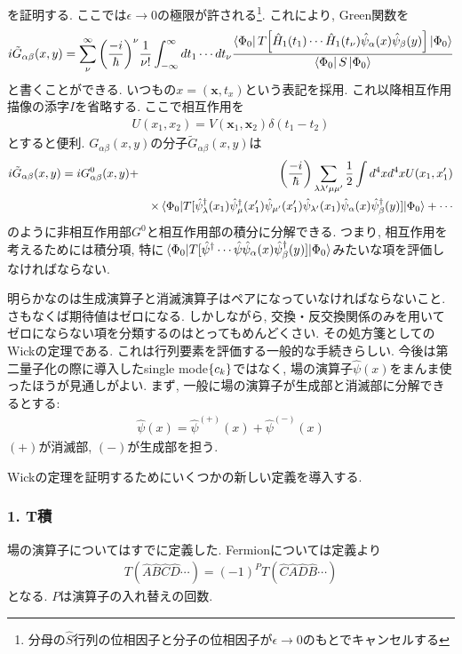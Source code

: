 \documentclass[10.5pt,a4paper]{jreport}
\newcommand{\bx}{\bm{x}}
\newcommand{\hpsi}{\hat{\psi}}
\begin{document}
を証明する. ここでは$\epsilon\rightarrow 0$の極限が許される\footnote{分母の$\hat{S}$行列の位相因子と分子の位相因子が$\epsilon\rightarrow 0$のもとでキャンセルする}. これにより, Green関数を
\begin{eqnarray}
  i\tilde{G}_{\alpha\beta}(x, y) = \sum_\nu^\infty \qty(\frac{-i}{\hbar})^\nu \frac{1}{\nu!}\int_{-\infty}^\infty dt_1\cdots dt_\nu\frac{\bra{\Phi_0}T\qty[\hat{H}_1(t_1)\cdots\hat{H}_1(t_\nu)\hpsi_\alpha(x)\hpsi_\beta(y)]\ket{\Phi_0}}{\bra{\Phi_0}S\ket{\Phi_0}}
\end{eqnarray}
と書くことができる. いつもの$x = (\bx, t_x)$という表記を採用. これ以降相互作用描像の添字$I$を省略する. ここで相互作用を
\begin{eqnarray}
  U(x_1, x_2) = V(\bx_1, \bx_2)\delta(t_1 - t_2)
\end{eqnarray}
とすると便利. $G_{\alpha\beta}(x, y)$の分子$\tilde{G}_{\alpha\beta}(x, y)$は
\begin{eqnarray}
\nonumber  i\tilde{G}_{\alpha\beta}(x, y) = iG^0_{\alpha\beta}(x, y) &+& \qty(\frac{-i}{\hbar})\sum_{\lambda\lambda'\mu\mu'}\frac{1}{2}\int d^4xd^4x U(x_1, x_1')\\
  &&\times \ev{T[\hpsi_{\lambda}^\dagger(x_1)\hpsi^\dagger_{\mu}(x_1')\hpsi_{\mu'}(x_1')\hpsi_{\lambda'}(x_1)\hpsi_{\alpha}(x)\hpsi^\dagger_{\beta}(y)]}{\Phi_0} + \cdots
\end{eqnarray}
のように非相互作用部$G^0$と相互作用部の積分に分解できる. つまり, 相互作用を考えるためには積分項, 特に$\ev{T[\hpsi^\dagger\cdots\hpsi\hpsi_{\alpha}(x)\hpsi^\dagger_{\beta}(y)]}{\Phi_0}$みたいな項を評価しなければならない.

明らかなのは生成演算子と消滅演算子はペアになっていなければならないこと. さもなくば期待値はゼロになる. しかしながら, 交換・反交換関係のみを用いてゼロにならない項を分類するのはとってもめんどくさい. その処方箋としてのWickの定理である. これは行列要素を評価する一般的な手続きらしい. 今後は第二量子化の際に導入したsingle mode$\qty{c_k}$ではなく, 場の演算子$\hpsi(x)$をまんま使ったほうが見通しがよい. まず, 一般に場の演算子が生成部と消滅部に分解できるとする:
\begin{eqnarray}
  \hpsi(x) = \hpsi^{(+)}(x) + \hpsi^{(-)}(x)
\end{eqnarray}
$(+)$が消滅部, $(-)$が生成部を担う.

Wickの定理を証明するためにいくつかの新しい定義を導入する.

\subsubsection{1. T積}
場の演算子についてはすでに定義した. Fermionについては定義より
\begin{eqnarray}
  T(\hat{A}\hat{B}\hat{C}\hat{D}\cdots) = (-1)^PT(\hat{C}\hat{A}\hat{D}\hat{B}\cdots)
\end{eqnarray}
となる. $P$は演算子の入れ替えの回数. 
\end{document}
